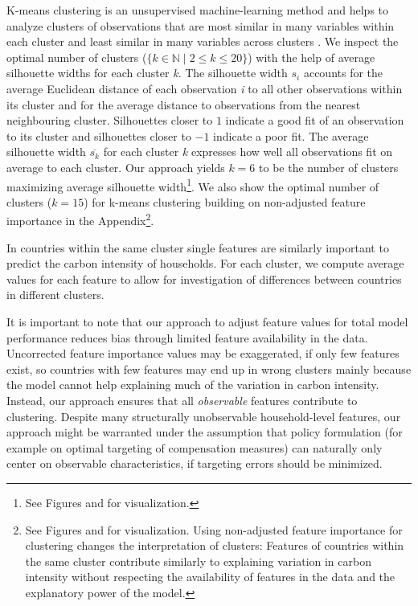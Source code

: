 \documentclass[12pt, a4paper]{article}
\begin{document}
K-means clustering is an unsupervised machine-learning method and helps to analyze clusters of observations that are most similar in many variables within each cluster and least similar in many variables across clusters \autocite{MacQueen.1967}. We inspect the optimal number of clusters ($\{k \in \mathbb{N} \mid 2  \leq k \leq 20 \}$) with the help of average silhouette widths \autocite{Rousseeuw.1987} for each cluster \textit{k}. The silhouette width $s_{i}$ accounts for the average Euclidean distance of each observation \textit{i} to all other observations within its cluster and for the average distance to observations from the nearest neighbouring cluster. Silhouettes closer to $1$ indicate a good fit of an observation to its cluster and silhouettes closer to $-1$ indicate a poor fit. The average silhouette width $\overline{s_{k}}$ for each cluster \textit{k} expresses how well all observations fit on average to each cluster. Our approach yields $k = 6$ to be the number of clusters maximizing average silhouette width\footnote{See Figures and  for visualization.}. We also show the optimal number of clusters ($k = 15$) for k-means clustering building on non-adjusted feature importance in the Appendix\footnote{See Figures  and  for visualization. Using non-adjusted feature importance for clustering changes the interpretation of clusters: Features of countries within the same cluster contribute similarly to explaining variation in carbon intensity without respecting the availability of features in the data and the explanatory power of the model.}.

In countries within the same cluster single features are similarly important to predict the carbon intensity of households. For each cluster, we compute average values for each feature to allow for investigation of differences between countries in different clusters.%

It is important to note that our approach to adjust feature values for total model performance reduces bias through limited feature availability in the data. Uncorrected feature importance values may be exaggerated, if only few features exist, so countries with few features may end up in wrong clusters mainly because the model cannot help explaining much of the variation in carbon intensity. Instead, our approach ensures that all \textit{observable} features contribute to clustering. Despite many structurally unobservable household-level features, our approach might be warranted under the assumption that policy formulation (for example on optimal targeting of compensation measures) can naturally only center on observable characteristics, if targeting errors should be minimized.
\end{document}
